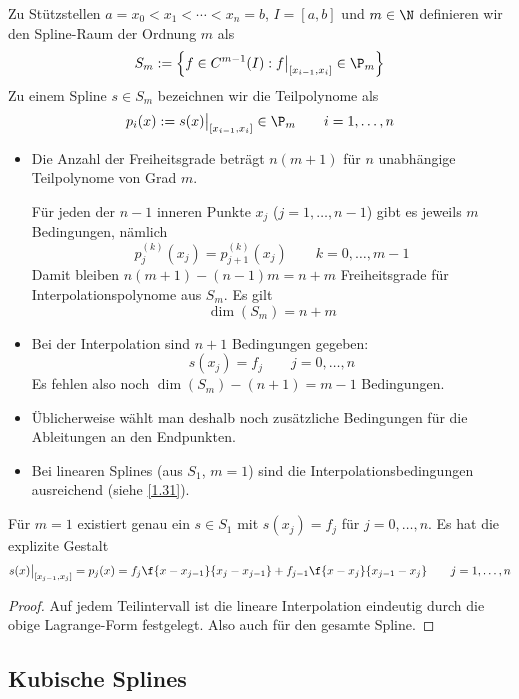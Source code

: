 \documentclass[11pt]{scrbook}
\begin{document}
\begin{df}
	\label{1.30}
	Zu Stützstellen $a=x_0 < x_1 < \dotsb < x_n = b$, $I=[a,b]$ und $m\in \N$ definieren wir den Spline-Raum der Ordnung $m$ als
	\[
		S_m := \Big\{ f\in C^{m-1}(I) : f\big|_{[x_{i-1},x_i]}\in \P_m\Big\}
	\]
	Zu einem Spline $s\in S_m$ bezeichnen wir die Teilpolynome als
	\[
		p_i(x) := s(x)\big|_{[x_{i-1},x_i]} \in \P_m \qquad i=1,\dotsc,n
	\]
\end{df}

\begin{nt*}
	\begin{itemize}
		\item
			Die Anzahl der Freiheitsgrade beträgt $n(m+1)$ für $n$ unabhängige Teilpolynome von Grad $m$.

			Für jeden der $n-1$ inneren Punkte $x_j$ ($j=1,\dotsc,n-1$) gibt es jeweils $m$ Bedingungen, nämlich
			\[
				p_j^{(k)}(x_j) = p_{j+1}^{(k)}(x_j) \qquad k = 0, \dotsc, m-1
			\]
			Damit bleiben $n(m+1)-(n-1)m = n+m$ Freiheitsgrade für Interpolationspolynome aus $S_m$.
			Es gilt
			\[
				\dim (S_m) = n+m
			\]
		\item
			Bei der Interpolation sind $n+1$ Bedingungen gegeben:
			\[
				s(x_j) = f_j \qquad j=0,\dotsc,n
			\]
			Es fehlen also noch $\dim (S_m) - (n+1) = m-1$ Bedingungen.
		\item
			Üblicherweise wählt man deshalb noch zusätzliche Bedingungen für die Ableitungen an den Endpunkten.
		\item
			Bei linearen Splines (aus $S_1$, $m=1$) sind die Interpolationsbedingungen ausreichend (siehe \ref{1.31}).
	\end{itemize}
\end{nt*}

\begin{st}
	\label{1.31}
	Für $m=1$ existiert genau ein $s\in S_1$ mit $s(x_j) = f_j$ für $j=0,\dotsc,n$.
	Es hat die explizite Gestalt
	\[
		s(x) \big|_{[x_{j-1},x_j]} = p_j(x) = f_j \f {x-x_{j-1}}{x_j - x_{j-1}} + f_{j-1}\f {x-x_j}{x_{j-1}-x_j}
		\qquad j=1,\dotsc,n
	\]
	\begin{proof}
		Auf jedem Teilintervall ist die lineare Interpolation eindeutig durch die obige Lagrange-Form festgelegt.
		Also auch für den gesamte Spline.
	\end{proof}
\end{st}

\subsection{Kubische Splines}
\end{document}
